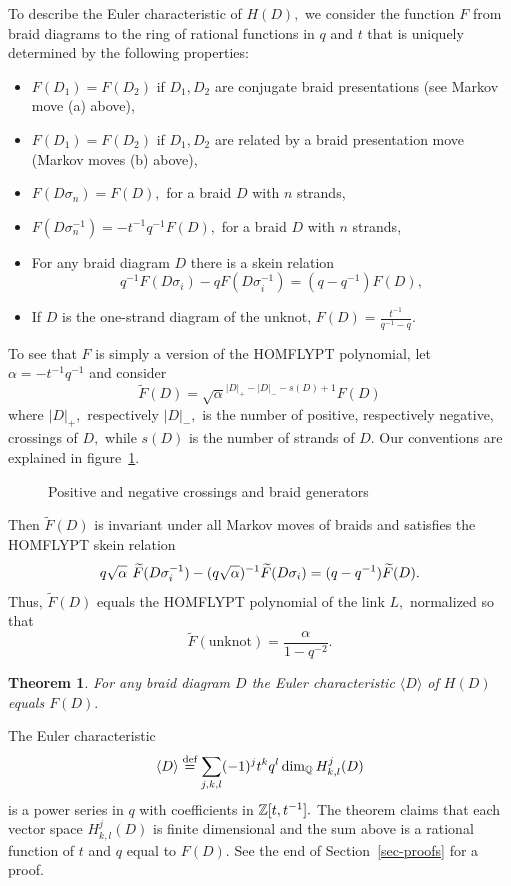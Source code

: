 \documentclass[12pt]{article}
\newtheorem{theorem}{Theorem}
\begin{document}
To describe the Euler characteristic of $H(D),$ we consider 
the function $F$ from braid diagrams to the ring of 
rational functions in $q$ and $t$ that is uniquely determined 
by the following properties: 

\begin{itemize} 
\item $F(D_1)=F(D_2)$ if $D_1,D_2$ are conjugate 
braid presentations (see Markov move (a) above),
\item $F(D_1)=F(D_2)$ if $D_1,D_2$ are related by a braid 
presentation move (Markov moves (b) above), 
\item $F(D \sigma_n) = F(D),$ for a braid $D$ with $n$ strands, 
\item $F(D\sigma_n^{-1})= - t^{-1}q^{-1} F(D),$ for a braid $D$ 
with $n$ strands, 
\item For any braid diagram $D$ there is a skein relation 
$$ q^{-1} F(D \sigma_i) - q F(D \sigma_i^{-1})= (q-q^{-1})
 F(D),$$ 
\item If $D$ is the one-strand diagram of the unknot, $F(D)=\frac{t^{-1}}{q^{-1}-q}.$ 
\end{itemize} 
To see that $F$ is simply a version of the 
HOMFLYPT polynomial, let $\alpha= - t^{-1}q^{-1}$ and 
consider
$$ 
\widetilde{F}(D) = \sqrt{\alpha}^{|D|_+ - |D|_-  - s(D)+1}  F(D) $$
where $|D|_+,$ respectively 
$|D|_-,$ is the number of positive, respectively negative,
crossings of $D,$ while $s(D)$ is the number of strands of $D.$ Our 
conventions are explained in figure~\ref{conv}. 
\begin{figure}  \caption{Positive and negative crossings 
and braid generators} \label{conv}
 \end{figure}
Then $\widetilde{F}(D)$ is invariant under all Markov moves of braids and 
satisfies the HOMFLYPT skein relation 
\begin{equation}\label{homfly-rel}
 q \sqrt{\alpha}\hspace{0.05in} \widetilde{F}(D\sigma_i^{-1}) - 
 (q \sqrt{\alpha})^{-1} \widetilde{F}(D\sigma_i) = (q-q^{-1}) \widetilde{F}(D).
\end{equation}  
Thus, $\widetilde{F}(D)$ equals the HOMFLYPT polynomial of the link $L,$ 
normalized so that 
$$\widetilde{F}(\mathrm{unknot})= \frac{\alpha }{1-q^{-2}}.$$

\begin{theorem} \label{sec-thm} 
For any braid diagram $D$ the Euler characteristic 
$\langle D \rangle$ of $H(D)$ equals $F(D).$
\end{theorem} 
The Euler characteristic 
\begin{equation*} \label{euler-char} 
  \langle D \rangle \stackrel{\mbox{\scriptsize{def}}}{=} \sum_{j,k,l}(-1)^j t^k q^l \dim_{\mathbb Q} 
 H^j_{k,l}(D)
 \end{equation*} 
is a power series in $q$ with coefficients in $\mathbb Z[t,t^{-1}].$ 
The theorem claims that each vector space 
$H^j_{k,l}(D)$ is finite dimensional and the sum above 
is a rational function of $t$ and $q$ equal to $F(D).$ 
See the end of Section~\ref{sec-proofs} for a proof. 
\end{document}
